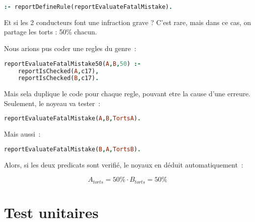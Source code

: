 \begin{lstlisting}[language=Prolog,frame=single]
:- reportDefineRule(reportEvaluateFatalMistake).
\end{lstlisting}

Et si les 2 conducteurs font une infraction grave ?
C'est rare, mais dans ce cas, on partage les torts : 50\% chacun.

Nous arions pus coder une regles du genre~:

\begin{lstlisting}[language=Prolog,frame=single]
reportEvaluateFatalMistake50(A,B,50) :-
    reportIsChecked(A,c17),
    reportIsChecked(B,c17).
\end{lstlisting}

Mais sela duplique le code pour chaque regle, pouvant etre la cause d'une erreure. Seulement, le noyeau va tester~:

\begin{lstlisting}[language=Prolog,frame=single]
reportEvaluateFatalMistake(A,B,TortsA).
\end{lstlisting}

Mais aussi~:

\begin{lstlisting}[language=Prolog,frame=single]
reportEvaluateFatalMistake(B,A,TortsB).
\end{lstlisting}

Alors, si les deux predicats sont verifi\'e, le noyaux en d\'eduit automatiquement~:

\[A_{torts} = 50\% \cdot B_{torts} = 50\%\]

\section{Test unitaires}

